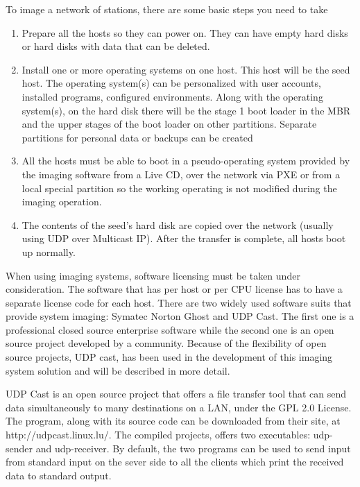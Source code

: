 To image a network of stations, there are some basic steps you need to take

\begin{enumerate}
\setcounter{enumi}{0}
\item Prepare all the hosts so they can power on. They can have empty
hard disks or hard disks with data that can be deleted.


\item Install one or more operating systems on one host.  This host will
be the seed host.  The operating system(s) can be personalized with
user accounts, installed programs, configured environments. Along with
the operating system(s), on the hard disk there will be the stage 1
boot loader in the \ac{MBR} and the upper stages of the boot loader on
other partitions. Separate partitions for personal data or backups can
be created


\item All the hosts must be able to boot in a pseudo-operating system
provided by the imaging software from a Live CD,  over the network via
PXE or from a local special partition so the working operating is not
modified during the imaging operation.


\item The contents of the seed’s hard disk are copied over the network
(usually using UDP over Multicast IP).  After the transfer is
complete, all hosts boot up normally.
\end{enumerate}



When using imaging systems, software licensing must be taken under
consideration.  The software that has per host or per CPU license has
to have a separate license code for each host.
There are two widely used software suits that provide system imaging:
Symatec Norton Ghost and UDP Cast. The first one is a professional
closed source enterprise software while the second one is an open
source project developed by a community.  Because of the flexibility
of open source projects, UDP cast, has been used in the development of
this imaging system solution and will be described in more detail.

UDP Cast is an open source project that offers a file transfer tool
that can send data simultaneously to many destinations on a \ac{LAN}, under
the \ac{GPL} 2.0 License. The program, along with its source code can be
downloaded from their site, at http://udpcast.linux.lu/.
The compiled projects, offers two executables:  udp-sender and
udp-receiver. By default, the two programs can be used to send input
from standard input on the sever side to all the clients which print
the received data to standard output.


